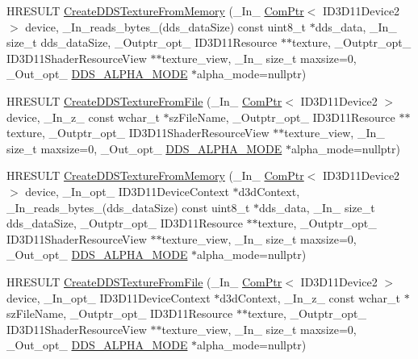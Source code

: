 \begin{DoxyCompactItemize}
\item 
H\+R\+E\+S\+U\+LT \hyperlink{namespacemage_a3480e988e224d62f6dbbd180920a1fa6}{Create\+D\+D\+S\+Texture\+From\+Memory} (\+\_\+\+In\+\_\+ \hyperlink{namespacemage_ae74f374780900893caa5555d1031fd79}{Com\+Ptr}$<$ I\+D3\+D11\+Device2 $>$ device, \+\_\+\+In\+\_\+reads\+\_\+bytes\+\_\+(dds\+\_\+data\+Size) const uint8\+\_\+t $\ast$dds\+\_\+data, \+\_\+\+In\+\_\+ size\+\_\+t dds\+\_\+data\+Size, \+\_\+\+Outptr\+\_\+opt\+\_\+ I\+D3\+D11\+Resource $\ast$$\ast$texture, \+\_\+\+Outptr\+\_\+opt\+\_\+ I\+D3\+D11\+Shader\+Resource\+View $\ast$$\ast$texture\+\_\+view, \+\_\+\+In\+\_\+ size\+\_\+t maxsize=0, \+\_\+\+Out\+\_\+opt\+\_\+ \hyperlink{namespacemage_a0c586a2bad862f4858900ca121ca80c2}{D\+D\+S\+\_\+\+A\+L\+P\+H\+A\+\_\+\+M\+O\+DE} $\ast$alpha\+\_\+mode=nullptr)
\item 
H\+R\+E\+S\+U\+LT \hyperlink{namespacemage_acbf88b358c9d52f8ff31917c5e04cd15}{Create\+D\+D\+S\+Texture\+From\+File} (\+\_\+\+In\+\_\+ \hyperlink{namespacemage_ae74f374780900893caa5555d1031fd79}{Com\+Ptr}$<$ I\+D3\+D11\+Device2 $>$ device, \+\_\+\+In\+\_\+z\+\_\+ const wchar\+\_\+t $\ast$sz\+File\+Name, \+\_\+\+Outptr\+\_\+opt\+\_\+ I\+D3\+D11\+Resource $\ast$$\ast$texture, \+\_\+\+Outptr\+\_\+opt\+\_\+ I\+D3\+D11\+Shader\+Resource\+View $\ast$$\ast$texture\+\_\+view, \+\_\+\+In\+\_\+ size\+\_\+t maxsize=0, \+\_\+\+Out\+\_\+opt\+\_\+ \hyperlink{namespacemage_a0c586a2bad862f4858900ca121ca80c2}{D\+D\+S\+\_\+\+A\+L\+P\+H\+A\+\_\+\+M\+O\+DE} $\ast$alpha\+\_\+mode=nullptr)
\item 
H\+R\+E\+S\+U\+LT \hyperlink{namespacemage_a6946968ad9beaed0ce448d1bfcdf3052}{Create\+D\+D\+S\+Texture\+From\+Memory} (\+\_\+\+In\+\_\+ \hyperlink{namespacemage_ae74f374780900893caa5555d1031fd79}{Com\+Ptr}$<$ I\+D3\+D11\+Device2 $>$ device, \+\_\+\+In\+\_\+opt\+\_\+ I\+D3\+D11\+Device\+Context $\ast$d3d\+Context, \+\_\+\+In\+\_\+reads\+\_\+bytes\+\_\+(dds\+\_\+data\+Size) const uint8\+\_\+t $\ast$dds\+\_\+data, \+\_\+\+In\+\_\+ size\+\_\+t dds\+\_\+data\+Size, \+\_\+\+Outptr\+\_\+opt\+\_\+ I\+D3\+D11\+Resource $\ast$$\ast$texture, \+\_\+\+Outptr\+\_\+opt\+\_\+ I\+D3\+D11\+Shader\+Resource\+View $\ast$$\ast$texture\+\_\+view, \+\_\+\+In\+\_\+ size\+\_\+t maxsize=0, \+\_\+\+Out\+\_\+opt\+\_\+ \hyperlink{namespacemage_a0c586a2bad862f4858900ca121ca80c2}{D\+D\+S\+\_\+\+A\+L\+P\+H\+A\+\_\+\+M\+O\+DE} $\ast$alpha\+\_\+mode=nullptr)
\item 
H\+R\+E\+S\+U\+LT \hyperlink{namespacemage_a7e3edb074eca31d4dc7143ec2b28d3a7}{Create\+D\+D\+S\+Texture\+From\+File} (\+\_\+\+In\+\_\+ \hyperlink{namespacemage_ae74f374780900893caa5555d1031fd79}{Com\+Ptr}$<$ I\+D3\+D11\+Device2 $>$ device, \+\_\+\+In\+\_\+opt\+\_\+ I\+D3\+D11\+Device\+Context $\ast$d3d\+Context, \+\_\+\+In\+\_\+z\+\_\+ const wchar\+\_\+t $\ast$sz\+File\+Name, \+\_\+\+Outptr\+\_\+opt\+\_\+ I\+D3\+D11\+Resource $\ast$$\ast$texture, \+\_\+\+Outptr\+\_\+opt\+\_\+ I\+D3\+D11\+Shader\+Resource\+View $\ast$$\ast$texture\+\_\+view, \+\_\+\+In\+\_\+ size\+\_\+t maxsize=0, \+\_\+\+Out\+\_\+opt\+\_\+ \hyperlink{namespacemage_a0c586a2bad862f4858900ca121ca80c2}{D\+D\+S\+\_\+\+A\+L\+P\+H\+A\+\_\+\+M\+O\+DE} $\ast$alpha\+\_\+mode=nullptr)

\end{DoxyCompactItemize}
